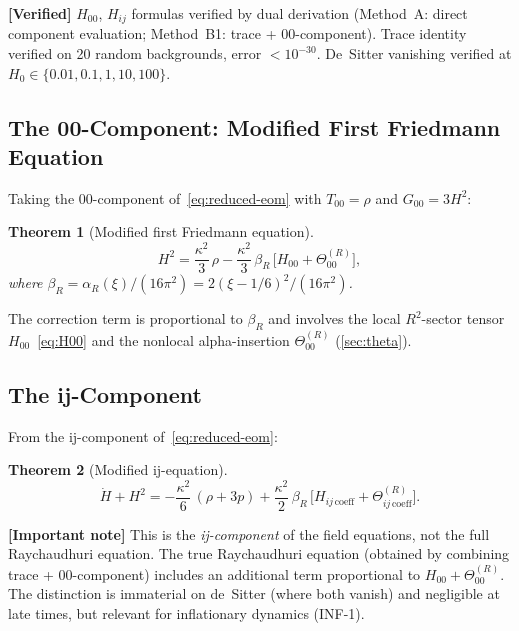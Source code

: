 \documentclass[11pt,a4paper]{article}
\theoremstyle{plain}
\newtheorem{theorem}{Theorem}[section]
\theoremstyle{definition}
\newcommand{\verified}[1]{%
  \par\smallskip\noindent
  \colorbox{green!10}{\parbox{\dimexpr\linewidth-2\fboxsep}{%
    \textcolor{green!50!black}{\textbf{[Verified]}} #1}}%
  \par\smallskip}
\newcommand{\signcorrection}[1]{%
  \par\smallskip\noindent
  \colorbox{red!10}{\parbox{\dimexpr\linewidth-2\fboxsep}{%
    \textcolor{red!60!black}{\textbf{[Important note]}} #1}}%
  \par\smallskip}
\begin{document}
\verified{$H_{00}$, $H_{ij}$ formulas verified by dual derivation
(Method~A: direct component evaluation; Method~B1: trace + 00-component).
Trace identity verified on 20 random backgrounds, error $< 10^{-30}$.
De~Sitter vanishing verified at $H_0 \in \{0.01, 0.1, 1, 10, 100\}$.}

\subsection{The 00-Component: Modified First Friedmann Equation}

Taking the 00-component of~\eqref{eq:reduced-eom} with
$T_{00} = \rho$ and $G_{00} = 3H^2$:

\begin{theorem}[Modified first Friedmann equation]\label{thm:friedmann-1}
\begin{equation}\label{eq:friedmann-1}
  \boxed{
  H^2 = \frac{\kappa^2}{3}\,\rho
  - \frac{\kappa^2}{3}\,\beta_R\,
  \bigl[H_{00} + \Theta^{(R)}_{00}\bigr],
  }
\end{equation}
where $\beta_R = \alpha_R(\xi)/(16\pi^2) = 2(\xi - 1/6)^2/(16\pi^2)$.
\end{theorem}

The correction term is proportional to $\beta_R$ and involves
the local $R^2$-sector tensor $H_{00}$~\eqref{eq:H00} and
the nonlocal alpha-insertion $\Theta^{(R)}_{00}$ (\cref{sec:theta}).

\subsection{The ij-Component}

From the ij-component of~\eqref{eq:reduced-eom}:

\begin{theorem}[Modified ij-equation]\label{thm:friedmann-2}
\begin{equation}\label{eq:friedmann-2}
  \dot{H} + H^2 = -\frac{\kappa^2}{6}\,(\rho + 3p)
  + \frac{\kappa^2}{2}\,\beta_R\,
  \bigl[H_{ij\,\mathrm{coeff}} + \Theta^{(R)}_{ij\,\mathrm{coeff}}\bigr].
\end{equation}
\end{theorem}

\signcorrection{This is the \emph{ij-component} of the field equations,
not the full Raychaudhuri equation. The true Raychaudhuri equation
(obtained by combining trace + 00-component) includes an additional
term proportional to $H_{00} + \Theta^{(R)}_{00}$. The distinction
is immaterial on de~Sitter (where both vanish) and negligible at
late times, but relevant for inflationary dynamics (INF-1).}
\end{document}
